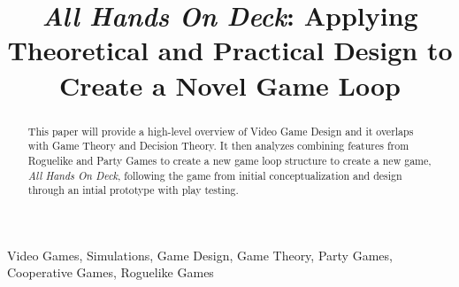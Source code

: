 \title{\textit{All Hands On Deck}: Applying Theoretical and Practical Design to Create a Novel Game Loop\\
}

\author{
}

\maketitle

\begin{abstract}
This paper will provide a high-level overview of Video Game
Design and it overlaps with Game Theory and Decision Theory.
It then analyzes combining features from Roguelike and Party
Games to create a new game loop structure to create a new
game, \textit{All Hands On Deck}, following the game from
initial conceptualization and design through an intial
prototype with play testing.
\end{abstract}

\begin{IEEEkeywords}
Video Games, Simulations, Game Design, Game Theory, Party Games, Cooperative Games, Roguelike Games
\end{IEEEkeywords}
